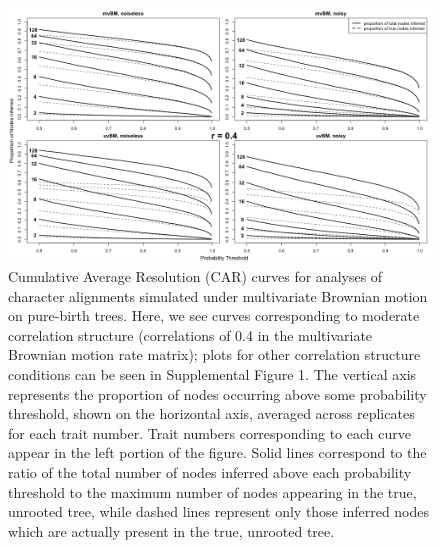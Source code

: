 \documentclass[10pt, twocolumn, twoside]{article}
\begin{document}
\begin{figure}[h]
\centering
\includegraphics[width=160mm]{figures/CARcurvesPBT.png}
\caption[Cumulative Average Resolution Curves for the Brownian Motion Simulation Study, Idealized Conditions]{Cumulative Average Resolution (CAR) curves for analyses of character alignments simulated under multivariate Brownian motion on pure-birth trees. Here, we see curves corresponding to moderate correlation structure (correlations of 0.4 in the multivariate Brownian motion rate matrix); plots for other correlation structure conditions can be seen in Supplemental Figure 1. The vertical axis represents the proportion of nodes occurring above some probability threshold, shown on the horizontal axis, averaged across replicates for each trait number. Trait numbers corresponding to each curve appear in the left portion of the figure. Solid lines correspond to the ratio of the total number of nodes inferred above each probability threshold to the maximum number of nodes appearing in the true, unrooted tree, while dashed lines represent only those inferred nodes which are actually present in the true, unrooted tree. 
\label{overflow}
\label{fig:carCurvePBT}
}
\end{figure}
\end{document}
